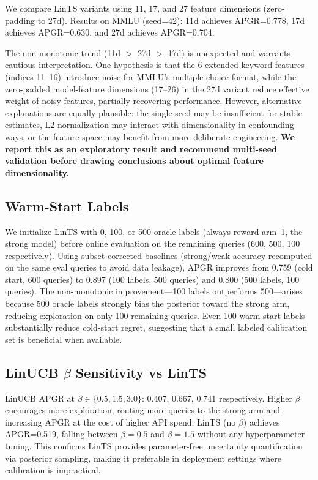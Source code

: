 \documentclass[11pt]{article}
\begin{document}
We compare LinTS variants using 11, 17, and 27 feature dimensions (zero-padding to 27d). Results on MMLU (seed=42): 11d achieves APGR=0.778, 17d achieves APGR=0.630, and 27d achieves APGR=0.704.

The non-monotonic trend (11d $>$ 27d $>$ 17d) is unexpected and warrants cautious interpretation. One hypothesis is that the 6 extended keyword features (indices 11--16) introduce noise for MMLU's multiple-choice format, while the zero-padded model-feature dimensions (17--26) in the 27d variant reduce effective weight of noisy features, partially recovering performance. However, alternative explanations are equally plausible: the single seed may be insufficient for stable estimates, L2-normalization may interact with dimensionality in confounding ways, or the feature space may benefit from more deliberate engineering. \textbf{We report this as an exploratory result and recommend multi-seed validation before drawing conclusions about optimal feature dimensionality.}

\subsection{Warm-Start Labels}

We initialize LinTS with 0, 100, or 500 oracle labels (always reward arm~1, the strong model) before online evaluation on the remaining queries (600, 500, 100 respectively). Using subset-corrected baselines (strong/weak accuracy recomputed on the same eval queries to avoid data leakage), APGR improves from 0.759 (cold start, 600 queries) to 0.897 (100 labels, 500 queries) and 0.800 (500 labels, 100 queries). The non-monotonic improvement---100 labels outperforms 500---arises because 500 oracle labels strongly bias the posterior toward the strong arm, reducing exploration on only 100 remaining queries. Even 100 warm-start labels substantially reduce cold-start regret, suggesting that a small labeled calibration set is beneficial when available.

\subsection{LinUCB $\beta$ Sensitivity vs LinTS}

LinUCB APGR at $\beta \in \{0.5, 1.5, 3.0\}$: 0.407, 0.667, 0.741 respectively. Higher $\beta$ encourages more exploration, routing more queries to the strong arm and increasing APGR at the cost of higher API spend. LinTS (no $\beta$) achieves APGR=0.519, falling between $\beta=0.5$ and $\beta=1.5$ without any hyperparameter tuning. This confirms LinTS provides parameter-free uncertainty quantification via posterior sampling, making it preferable in deployment settings where calibration is impractical.
\end{document}
